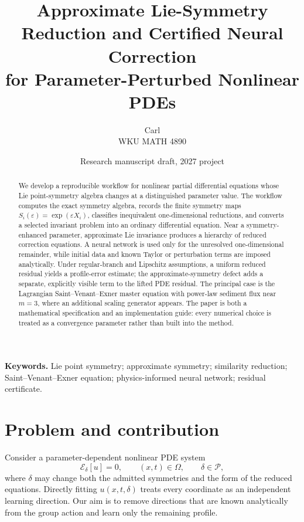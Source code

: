 \documentclass[11pt]{article}
\title{Approximate Lie-Symmetry Reduction and Certified Neural Correction\\
for Parameter-Perturbed Nonlinear PDEs}
\author{Carl\\WKU MATH 4890}
\date{Research manuscript draft, 2027 project}
\newcommand{\E}{\mathcal E}
\newcommand{\eps}{\varepsilon}
\begin{document}
\maketitle

\begin{abstract}
We develop a reproducible workflow for nonlinear partial differential equations whose Lie point-symmetry algebra changes at a distinguished parameter value.  The workflow computes the exact symmetry algebra, records the finite symmetry maps $S_i(\eps)=\exp(\eps X_i)$, classifies inequivalent one-dimensional reductions, and converts a selected invariant problem into an ordinary differential equation.  Near a symmetry-enhanced parameter, approximate Lie invariance produces a hierarchy of reduced correction equations.  A neural network is used only for the unresolved one-dimensional remainder, while initial data and known Taylor or perturbation terms are imposed analytically.  Under regular-branch and Lipschitz assumptions, a uniform reduced residual yields a profile-error estimate; the approximate-symmetry defect adds a separate, explicitly visible term to the lifted PDE residual.  The principal case is the Lagrangian Saint--Venant--Exner master equation with power-law sediment flux near $m=3$, where an additional scaling generator appears.  The paper is both a mathematical specification and an implementation guide: every numerical choice is treated as a convergence parameter rather than built into the method.
\end{abstract}

\noindent\textbf{Keywords.} Lie point symmetry; approximate symmetry; similarity reduction; Saint--Venant--Exner equation; physics-informed neural network; residual certificate.

\section{Problem and contribution}

Consider a parameter-dependent nonlinear PDE system
\begin{equation}
  \E_{\delta}[u]=0,
  \qquad (x,t)\in\Omega,
  \qquad \delta\in\mathcal P,
  \label{eq:general-pde}
\end{equation}
where $\delta$ may change both the admitted symmetries and the form of the reduced equations.  Directly fitting $u(x,t,\delta)$ treats every coordinate as an independent learning direction.  Our aim is to remove directions that are known analytically from the group action and learn only the remaining profile.
\end{document}
